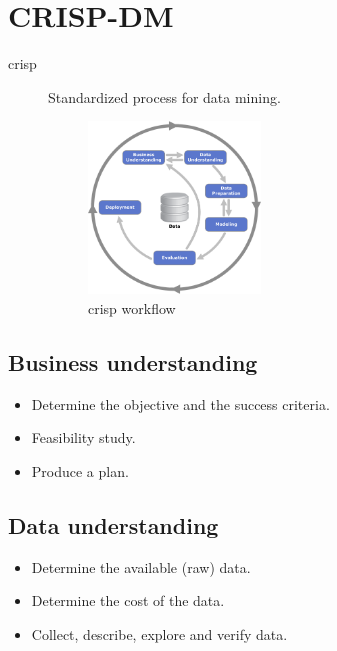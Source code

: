 \chapter{CRISP-DM}

\begin{description}
    \item[\Acl{crisp}] 
        Standardized process for data mining.
        \begin{figure}[H]
            \centering
            \includegraphics[width=0.45\textwidth]{img/crisp.png}
            \caption{\ac{crisp} workflow}
        \end{figure}
\end{description}


\section{Business understanding}
\begin{itemize}
    \item Determine the objective and the success criteria.
    \item Feasibility study.
    \item Produce a plan.
\end{itemize}

\section{Data understanding}
\begin{itemize}
    \item Determine the available (raw) data.
    \item Determine the cost of the data.
    \item Collect, describe, explore and verify data.
\end{itemize}

